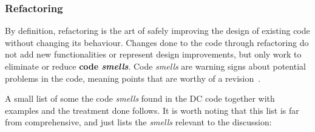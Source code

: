\subsubsection{Refactoring}\label{sssec:refactoring}
By definition, refactoring is the art of safely improving the design of existing code without changing its behaviour.
Changes done to the code through refactoring do not add new functionalities or represent design improvements, but only work to eliminate or reduce \textbf{code \textit{smells}}. %
Code \textit{smells} are warning signs about potential problems in the code, meaning points that are worthy of a revision~\cite{wake2004refactoring}.

A small list of some the code \textit{smells} found in the DC code together with examples and the treatment done follows.
It is worth noting that this list is far from comprehensive, and just lists the \textit{smells} relevant to the discussion:
